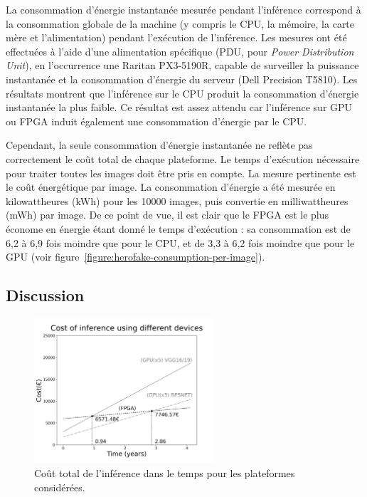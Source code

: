 La consommation d'énergie instantanée mesurée pendant l'inférence correspond à la consommation globale de la machine (y compris le \gls{CPU}, la mémoire, la carte mère et l'alimentation) pendant l'exécution de l'inférence.
Les mesures ont été effectuées à l'aide d'une alimentation spécifique (\gls{PDU}, pour \textit{Power Distribution Unit}), en l'occurrence une Raritan PX3-5190R, capable de surveiller la puissance instantanée et la consommation d'énergie du serveur (Dell Precision T5810). Les résultats montrent que l'inférence sur le \gls{CPU} produit la consommation d'énergie instantanée la plus faible. Ce résultat est assez attendu car l'inférence sur \gls{GPU} ou \gls{FPGA} induit également une consommation d'énergie par le \gls{CPU}.

Cependant, la seule consommation d'énergie instantanée ne reflète pas correctement le coût total de chaque plateforme. Le temps d'exécution nécessaire pour traiter toutes les images doit être pris en compte. La mesure pertinente est le coût énergétique par image. La consommation d'énergie a été mesurée en kilowattheures (kWh) pour les 10000 images, puis convertie en milliwattheures (mWh) par image. De ce point de vue, il est clair que le \gls{FPGA} est le plus économe en énergie étant donné le temps d'exécution : sa consommation est de 6,2 à 6,9 fois moindre que pour le \gls{CPU}, et de 3,3 à 6,2 fois moindre que pour le \gls{GPU} (voir figure~\ref{figure:herofake-consumption-per-image}).

\subsection{Discussion}

\begin{figure}[!ht]
    \centering
    \includegraphics[width=0.6\textwidth]{4_Chapitre4/figures/characterization/cost_devices_time.png}
    \caption{Coût total de l'inférence dans le temps pour les plateformes considérées.}
    \label{figure:herofake-cost-over-time}
\end{figure}

